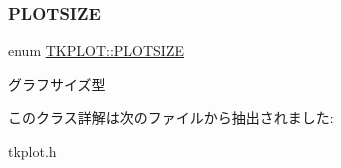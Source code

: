 \subsubsection{\texorpdfstring{P\+L\+O\+T\+S\+I\+ZE}{PLOTSIZE}}
{\footnotesize\ttfamily enum \hyperlink{class_t_k_p_l_o_t_a158082ae168750554cf23edde9a27416}{T\+K\+P\+L\+O\+T\+::\+P\+L\+O\+T\+S\+I\+ZE}\hspace{0.3cm}{\ttfamily [strong]}}

グラフサイズ型 

このクラス詳解は次のファイルから抽出されました\+:\begin{DoxyCompactItemize}
\item 
tkplot.\+h\end{DoxyCompactItemize}

